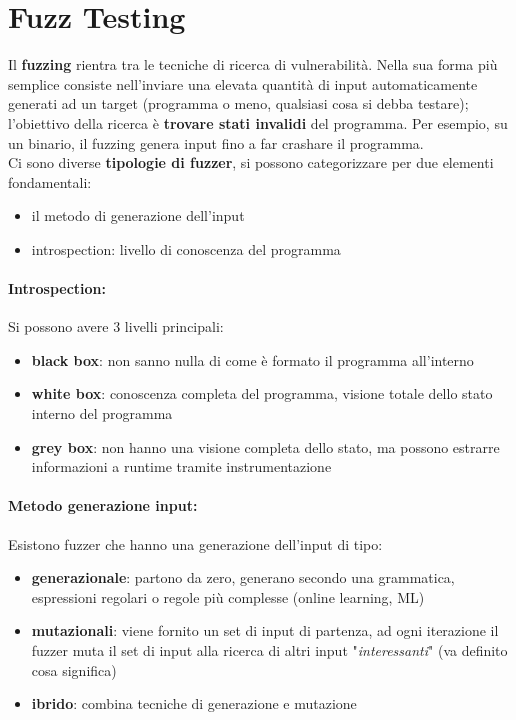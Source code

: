 \section{Fuzz Testing}

Il \textbf{fuzzing} rientra tra le tecniche di ricerca di vulnerabilità. Nella sua forma più semplice consiste nell'inviare una elevata quantità di input automaticamente generati ad un target (programma o meno, qualsiasi cosa si debba testare); l'obiettivo della ricerca è \textbf{trovare stati invalidi} del programma. Per esempio, su un binario, il fuzzing genera input fino a far crashare il programma.\\

Ci sono diverse \textbf{tipologie di fuzzer}, si possono categorizzare per due elementi fondamentali: 
\begin{itemize}
	\item il metodo di generazione dell'input
	\item introspection: livello di conoscenza del programma
\end{itemize}

\paragraph{Introspection:} Si possono avere 3 livelli principali: 
\begin{itemize}
	\item \textbf{black box}: non sanno nulla di come è formato il programma all'interno
	\item \textbf{white box}: conoscenza completa del programma, visione totale dello stato interno del programma
	\item \textbf{grey box}: non hanno una visione completa dello stato, ma possono estrarre informazioni a runtime tramite instrumentazione
\end{itemize}

\paragraph{Metodo generazione input:} Esistono fuzzer che hanno una generazione dell'input di tipo: 
\begin{itemize}
	\item \textbf{generazionale}: partono da zero, generano secondo una grammatica, espressioni regolari o regole più complesse (online learning, ML)
	\item \textbf{mutazionali}: viene fornito un set di input di partenza, ad ogni iterazione il fuzzer muta il set di input alla ricerca di altri input "\textit{interessanti}" (va definito cosa significa)
	\item \textbf{ibrido}: combina tecniche di generazione e mutazione
\end{itemize}

